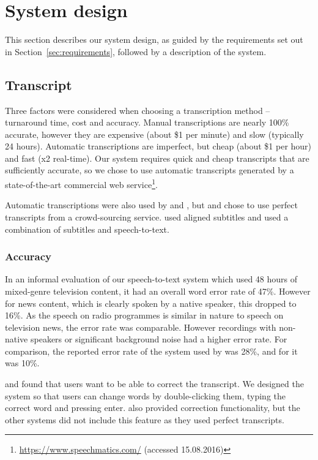 \section{System design}\label{sec:screen-design}
This section describes our system design, as guided by the requirements set out in Section~\ref{sec:requirements},
followed by a description of the system.

\subsection{Transcript}
Three factors were considered when choosing a transcription method -- turnaround time, cost and accuracy. Manual
transcriptions are nearly 100\% accurate, however they are expensive (about \$1 per minute) and slow (typically 24
hours). Automatic transcriptions are imperfect, but cheap (about \$1 per hour) and fast (x2 real-time). Our system
requires quick and cheap transcripts that are sufficiently accurate, so we chose to use automatic transcripts generated
by a state-of-the-art commercial web service\footnote{\url{https://www.speechmatics.com/} (accessed 15.08.2016)}.

Automatic transcriptions were also used by \citet{Whittaker2004} and \citet{Sivaraman2016}, but \citet{Berthouzoz2012}
and \citet{Rubin2013} chose to use perfect transcripts from a crowd-sourcing service. \citet{Hyperaudio2016} used
aligned subtitles and \citet{Casares2002} used a combination of subtitles and speech-to-text.

\subsubsection{Accuracy}\label{sec:transcript}
In an informal evaluation of our speech-to-text system which used 48 hours of mixed-genre television content, it had an
overall word error rate of 47\%.  However for news content, which is clearly spoken by a native speaker, this dropped
to 16\%. As the speech on radio programmes is similar in nature to speech on television news, the error rate was
comparable. However recordings with non-native speakers or significant background noise had a higher error rate. For
comparison, the reported error rate of the system used by
\citet{Whittaker2004} was 28\%, and for \citet{Sivaraman2016} it was 10\%.

\citet{Whittaker2004} and \citet{Sivaraman2016} found that users want to be able to correct the transcript. We designed
the system so that users can change words by double-clicking them, typing the correct word and pressing enter.
\citet{Casares2002} also provided correction functionality, but the other systems did not include this feature as they
used perfect transcripts.

